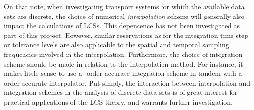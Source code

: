 On that note, when investigating transport systems for which the available
data sets are discrete, the choice of numerical \emph{interpolation} scheme
will generally also impact the calculations of LCSs. This depencence has not
been investigated as part of this project. However, similar reservations
as for the integration time step or tolerance levels are also applicable to
the spatial and temporal sampling frequencies involved in the interpolation.
Furthermore, the choice of integration scheme should be made in relation
to the interpolation method. For instance, it makes little sense to use a
-order accurate integration scheme in tandem with a -order
accurate interpolator. Put simply, the interaction between interpolation
and integration schemes in the analysis of discrete data sets is of great
interest for practical applications of the LCS theory, and warrants
further investigation.
